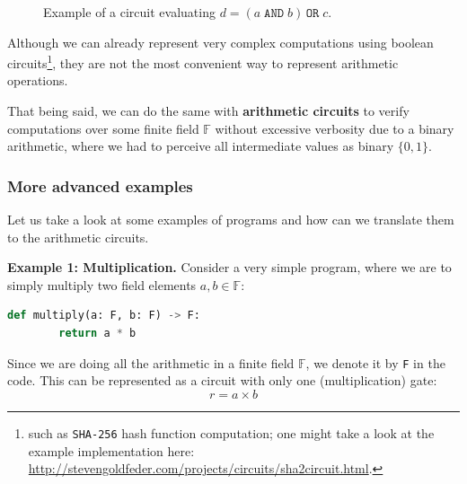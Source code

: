 \documentclass[../../book.tex]{subfiles}
\begin{document}
\begin{figure}[h!]
    \centering
    \caption{Example of a circuit evaluating $d = (a \;\texttt{AND}\; b) \,\texttt{OR}\; c$.}
    \label{fig:bool-circuit}
\end{figure}

Although we can already represent very complex computations using boolean
circuits\footnote{such as \texttt{SHA-256} hash function computation; one might
take a look at the example implementation here:
\url{http://stevengoldfeder.com/projects/circuits/sha2circuit.html}.}, they are
not the most convenient way to represent arithmetic operations. 

That being said, we can do the same with \textbf{arithmetic circuits} to verify
computations over some finite field $\mathbb{F}$ without excessive verbosity due
to a binary arithmetic, where we had to perceive all intermediate values as
binary $\{0,1\}$.

\subsubsection{More advanced examples}

Let us take a look at some examples of programs and how can we translate them to
the arithmetic circuits. 

\textbf{Example 1: Multiplication.} Consider a very simple program, where we are
to simply multiply two field elements $a,b \in \mathbb{F}$:

\begin{lstlisting}[language=Python,numbers=none]
    def multiply(a: F, b: F) -> F:
        return a * b
\end{lstlisting}

Since we are doing all the arithmetic in a finite field $\mathbb{F}$, we denote it by \texttt{F} in the code. This can be represented as a circuit with only one (multiplication) gate:
\begin{equation*}
    r = a \times b
\end{equation*}    
\end{document}
